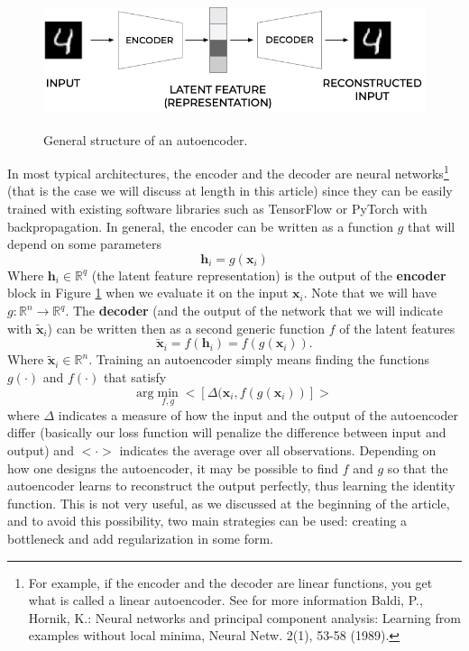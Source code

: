 \documentclass[12pt,a4]{article}
\begin{document}
\begin{figure}[hbt]
\centering
\includegraphics[width=12.61cm,height=3.97cm]{./images/image3.png}
\caption{General structure of an autoencoder.}
\label{fig:arch}
\end{figure}




In most typical architectures, the encoder and the decoder are neural networks\footnote{ For example, if the encoder and the decoder are linear functions, you get what is called a linear autoencoder. See for more information Baldi, P., Hornik, K.: Neural networks and principal component analysis: Learning from examples without local minima, Neural Netw. 2(1), 53-58 (1989).} (that is the case we will discuss at length in this article) since they can be easily trained with existing software libraries such as TensorFlow or PyTorch with backpropagation. 
In general, the encoder can be written as a function \( g\) that will depend on some parameters
\begin{equation}
\mathbf{h}_{i} = g(\mathbf{x}_{i})
\end{equation}
Where \(\mathbf{h}_{i}\in\mathbb{R}^{q}\) (the latent feature representation) is the output of the \textbf{encoder} block in Figure \ref{fig:arch} when we evaluate it on the input \(\mathbf{x}_{i}\). Note that we will have \( g:\mathbb{R}^{n}\rightarrow\mathbb{R}^{q}\).
The \textbf{decoder} (and the output of the network that we will indicate with \(\tilde{\mathbf{x}}_{i}\)) can be written then as a second generic function \( f\) of the latent features
\begin{equation}
\tilde{\mathbf{x}}_{i} = f\left(\mathbf{h}_{i}\right) = f\left(g\left(\mathbf{x}_{i}\right)\right).
\end{equation}
Where \(\tilde{\mathbf{x}}_{i}\mathbf{\in }\mathbb{R}^{n}\). Training an autoencoder simply means finding the functions \( g(\cdot)\) and \( f(\cdot)\) that satisfy
\begin{equation}
\textrm{arg}\min_{f,g}<\left[\Delta (\mathbf{x}_{i}, f(g\left(\mathbf{x}_{i}\right))\right]>
\end{equation}
where \( \Delta\) indicates a measure of how the input and the output of the autoencoder differ (basically our loss function will penalize the difference between input and output) and \( <\cdot>\) indicates the average over all observations.  Depending on how one designs the autoencoder, it may be possible to find \( f\) and \( g\) so that the autoencoder learns to reconstruct the output perfectly, thus learning the identity function. This is not very useful, as we discussed at the beginning of the article, and to avoid this possibility, two main strategies can be used: creating a bottleneck and add regularization in some form. 
\end{document}
